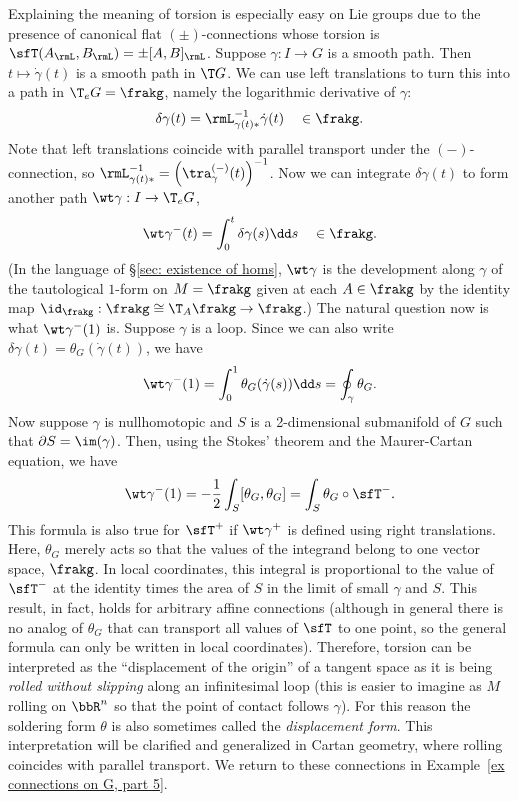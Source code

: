 \begin{example}
    Explaining the meaning of torsion is especially easy on Lie groups due to the presence of canonical flat $(\pm)$-connections whose torsion is $\sfT(A_\rmL,B_\rmL)=\pm [A,B]_\rmL$. Suppose $\gamma:I\to G$ is a smooth path. Then $t\mapsto \dot\gamma(t)$ is a smooth path in $\T G$. We can use left translations to turn this into a path in $\T_e G=\frakg$, namely the logarithmic derivative of $\gamma$:
    \[\delta \gamma(t)=\rmL_{\gamma(t)\ast}^{-1}\dot\gamma(t)\quad \in \frakg.\]
    Note that left translations coincide with parallel transport under the $(-)$-connection, so $\rmL_{\gamma(t)\ast}^{-1}=\left(\tra^{(-)}_{\gamma}(t)\right)^{-1}$. Now we can integrate $\delta\gamma(t)$ to form another path $\wt\gamma:I\to \T_e G$,
    \[\wt\gamma^-(t)=\int_0^t \delta\gamma(s)\dd s \quad \in \frakg.\]
    (In the language of \S\ref{sec: existence of homs}, $\wt\gamma$ is the development along $\gamma$ of the tautological $1$-form on $M=\frakg$ given at each $A\in\frakg$ by the identity map $\id_{\frakg}:\frakg\cong \T_A\frakg\to \frakg$.) The natural question now is what $\wt\gamma^-(1)$ is. Suppose $\gamma$ is a loop. Since we can also write $\delta\gamma(t)=\theta_G(\dot\gamma(t))$, we have
    \[\wt\gamma^-(1)=\int_0^1 \theta_G(\dot\gamma(s))\dd s=\oint_\gamma \theta_G.\]
    Now suppose $\gamma$ is nullhomotopic and $S$ is a 2-dimensional submanifold of $G$ such that $\partial S=\im(\gamma)$. Then, using the Stokes' theorem and the Maurer-Cartan equation, we have
    \[\wt\gamma^-(1)=-\frac12\int_S [\theta_G,\theta_G]=\int_S \theta_G\circ \sfT^-.\]
    This formula is also true for $\sfT^+$ if $\wt\gamma^+$ is defined using right translations. Here, $\theta_G$ merely acts so that the values of the integrand belong to one vector space, $\frakg$. In local coordinates, this integral is proportional to the value of $\sfT^-$ at the identity times the area of $S$ in the limit of small $\gamma$ and $S$. This result, in fact, holds for arbitrary affine connections (although in general there is no analog of $\theta_G$ that can transport all values of $\sfT$ to one point, so the general formula can only be written in local coordinates). Therefore, torsion can be interpreted as the ``displacement of the origin'' of a tangent space as it is being \emph{rolled without slipping} along an infinitesimal loop (this is easier to imagine as $M$ rolling on $\bbR^n$ so that the point of contact follows $\gamma$). For this reason the soldering form $\theta$ is also sometimes called the \emph{displacement form}. This interpretation will be clarified and generalized in Cartan geometry, where rolling coincides with parallel transport. We return to these connections in Example~\ref{ex connections on G, part 5}.
\end{example}








